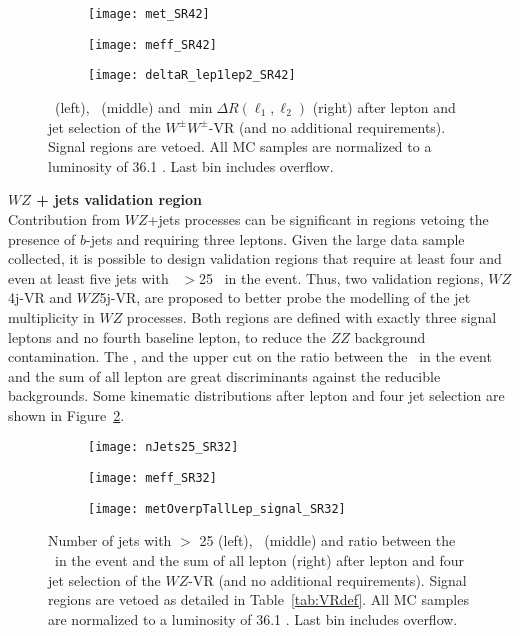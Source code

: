 \begin{figure}[t!]
\centering
\begin{subfigure}[t]{0.32\textwidth}
\texttt{[image: met\_SR42]}
\end{subfigure}
\begin{subfigure}[t]{0.32\textwidth}
\texttt{[image: meff\_SR42]}
\end{subfigure}
\begin{subfigure}[t]{0.32\textwidth}
\texttt{[image: deltaR\_lep1lep2\_SR42]}
\end{subfigure}
\caption{\met\ (left), \meff\ (middle) and $\operatorname{min}\Delta R (\ell_{1}, \ell_2)$ (right) after lepton and jet selection of the $W^\pm W^\pm$-VR (and no additional requirements). Signal regions are vetoed. All MC samples are normalized to a luminosity of 36.1 \ifb. Last bin includes overflow.
}
\label{fig:WW_VR_afterLepJetSel}
\end{figure} 


\par{\bf $WZ$ + jets validation region\\}
Contribution from $WZ$+jets processes can be significant in regions vetoing the presence of $b$-jets and requiring three leptons. 
Given the large data sample collected, it is possible to design validation 
regions that require at least four and even at least five jets with \pt~$>$25 \GeV~in the event. Thus, two validation regions, $WZ$4j-VR and $WZ$5j-VR, are proposed to better probe the modelling of the jet multiplicity in $WZ$ processes. Both regions are defined with exactly three signal leptons and no fourth baseline lepton, to reduce the $ZZ$ background contamination. The \meff, and the upper cut on the ratio between the \met\ in the event and the sum of all lepton \pt are great discriminants against the reducible backgrounds. Some kinematic distributions after lepton and four jet selection are shown in Figure~\ref{fig:WZ_VR_afterLepJetSel}.

\begin{figure}[t!]
\centering
\begin{subfigure}[t]{0.32\textwidth}
\texttt{[image: nJets25\_SR32]}
\end{subfigure}
\begin{subfigure}[t]{0.32\textwidth}
\texttt{[image: meff\_SR32]}
\end{subfigure}
\begin{subfigure}[t]{0.32\textwidth}
\texttt{[image: metOverpTallLep\_signal\_SR32]}
\end{subfigure}
\caption{Number of jets with \pt $>$ 25 \GeV (left), \meff\ (middle) and ratio between the \met\ in the event and the sum of all lepton \pt (right) after lepton and four jet selection of the $WZ$-VR (and no additional requirements). Signal regions are vetoed as detailed in Table~\ref{tab:VRdef}. All MC samples are normalized to a luminosity of 36.1 \ifb. Last bin includes overflow.
}
\label{fig:WZ_VR_afterLepJetSel}
\end{figure} 

